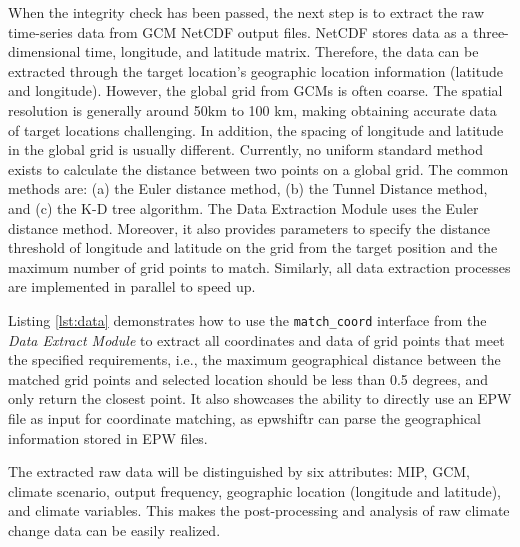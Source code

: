 \documentclass[twocolumn, a4paper,10pt]{article}
\begin{document}
When the integrity check has been passed, the next step is to extract the raw
time-series data from GCM NetCDF output files. NetCDF stores data as a
three-dimensional time, longitude, and latitude matrix. Therefore, the data can
be extracted through the target location's geographic location information
(latitude and longitude). However, the global grid from GCMs is often coarse.
The spatial resolution is generally around 50km to 100 km, making obtaining
accurate data of target locations challenging. In addition, the spacing of
longitude and latitude in the global grid is usually different. Currently, no
uniform standard method exists to calculate the distance between two points on a
global grid. The common methods are: (a) the Euler distance method, (b) the Tunnel
Distance method, and (c) the K-D tree algorithm. The Data Extraction Module uses the
Euler distance method. Moreover, it also provides parameters to specify the
distance threshold of longitude and latitude on the grid from the target
position and the maximum number of grid points to match. Similarly, all data
extraction processes are implemented in parallel to speed up.

Listing \ref{lst:data} demonstrates how to use the \texttt{match\_coord} interface from
the \emph{Data Extract Module} to extract all coordinates and data of grid points that
meet the specified requirements, i.e., the maximum geographical distance between
the matched grid points and selected location should be less than 0.5 degrees,
and only return the closest point. It also showcases the ability to directly
use an EPW file as input for coordinate matching, as epwshiftr can parse the
geographical information stored in EPW files.

The extracted raw data will be distinguished by six attributes: MIP, GCM,
climate scenario, output frequency, geographic location (longitude and latitude),
and climate variables. This makes the post-processing and analysis of raw
climate change data can be easily realized.
\end{document}
